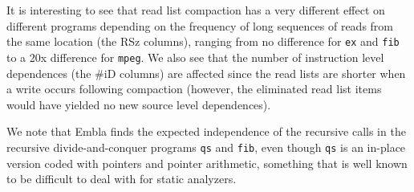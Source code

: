 \documentclass[times, 10pt,twocolumn]{article}
\begin{document}
It is interesting
to see that read list compaction has a very different effect on different 
programs depending on the frequency of long sequences of reads from the same 
location (the RSz columns), ranging from no difference for {\tt ex} and 
{\tt fib} to a 20x difference for {\tt mpeg}. We also see that the number of 
instruction 
level dependences (the \#iD columns) are affected since the read lists 
are shorter when a write occurs following compaction (however, the 
eliminated read list 
items would have yielded no new source level dependences).

We note that Embla finds the expected independence of the recursive calls 
in the recursive divide-and-conquer programs {\tt qs} and
{\tt fib}, even though {\tt qs} is an in-place version coded 
with pointers and pointer arithmetic, something that is well known to be 
difficult to deal with for static analyzers. 
\end{document}
